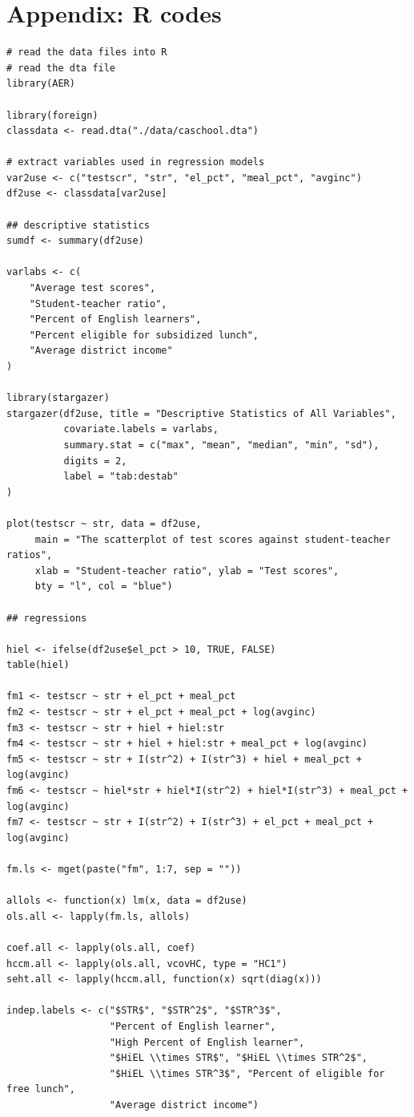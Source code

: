 \documentclass[11pt]{article}
\begin{document}
\section{Appendix: R codes}
\label{sec:orgddd1dbf}
\begin{verbatim}
# read the data files into R
# read the dta file
library(AER)

library(foreign)
classdata <- read.dta("./data/caschool.dta")

# extract variables used in regression models
var2use <- c("testscr", "str", "el_pct", "meal_pct", "avginc")
df2use <- classdata[var2use]

## descriptive statistics
sumdf <- summary(df2use)

varlabs <- c(
    "Average test scores",
    "Student-teacher ratio",
    "Percent of English learners",
    "Percent eligible for subsidized lunch",
    "Average district income"
)

library(stargazer)
stargazer(df2use, title = "Descriptive Statistics of All Variables",
          covariate.labels = varlabs,
          summary.stat = c("max", "mean", "median", "min", "sd"),
          digits = 2,
          label = "tab:destab"
)

plot(testscr ~ str, data = df2use,
     main = "The scatterplot of test scores against student-teacher ratios",
     xlab = "Student-teacher ratio", ylab = "Test scores",
     bty = "l", col = "blue")

## regressions

hiel <- ifelse(df2use$el_pct > 10, TRUE, FALSE)
table(hiel)

fm1 <- testscr ~ str + el_pct + meal_pct
fm2 <- testscr ~ str + el_pct + meal_pct + log(avginc)
fm3 <- testscr ~ str + hiel + hiel:str
fm4 <- testscr ~ str + hiel + hiel:str + meal_pct + log(avginc)
fm5 <- testscr ~ str + I(str^2) + I(str^3) + hiel + meal_pct + log(avginc)
fm6 <- testscr ~ hiel*str + hiel*I(str^2) + hiel*I(str^3) + meal_pct + log(avginc)
fm7 <- testscr ~ str + I(str^2) + I(str^3) + el_pct + meal_pct + log(avginc)

fm.ls <- mget(paste("fm", 1:7, sep = ""))

allols <- function(x) lm(x, data = df2use)
ols.all <- lapply(fm.ls, allols)

coef.all <- lapply(ols.all, coef)
hccm.all <- lapply(ols.all, vcovHC, type = "HC1")
seht.all <- lapply(hccm.all, function(x) sqrt(diag(x)))

indep.labels <- c("$STR$", "$STR^2$", "$STR^3$",
                  "Percent of English learner",
                  "High Percent of English learner",
                  "$HiEL \\times STR$", "$HiEL \\times STR^2$",
                  "$HiEL \\times STR^3$", "Percent of eligible for free lunch",
                  "Average district income")


\end{verbatim}
\end{document}
